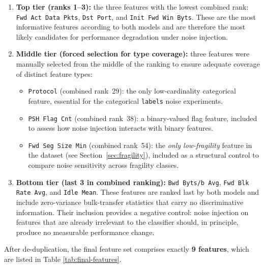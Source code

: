 \documentclass[../main.tex]{subfiles}
\begin{document}
\begin{itemize}
    \begin{enumerate}
        \item \textbf{Top tier (ranks 1–3):} the three features with the lowest combined rank: \texttt{Fwd Act Data Pkts}, \texttt{Dst Port}, and \texttt{Init Fwd Win Byts}.  These are the most informative features according to both models and are therefore the most likely candidates for performance degradation under noise injection.
        \item \textbf{Middle tier (forced selection for type coverage):} three features were manually selected from the middle of the ranking to ensure adequate coverage of distinct feature types:
        \begin{itemize}
            \item \texttt{Protocol} (combined rank~29): the only low-cardinality categorical feature, essential for the categorical \texttt{labels} noise experiments.
            \item \texttt{PSH Flag Cnt} (combined rank~38): a binary-valued flag feature, included to assess how noise injection interacts with binary features.
            \item \texttt{Fwd Seg Size Min} (combined rank~54): the \emph{only low-fragility} feature in the dataset (see Section~\ref{sec:fragility}), included as a structural control to compare noise sensitivity across fragility classes.
        \end{itemize}
        \item \textbf{Bottom tier (last 3 in combined ranking):} \texttt{Bwd Byts/b Avg}, \texttt{Fwd Blk Rate Avg}, and \texttt{Idle Mean}.  These features are ranked last by both models and include zero-variance bulk-transfer statistics that carry no discriminative information.  Their inclusion provides a negative control: noise injection on features that are already irrelevant to the classifier should, in principle, produce no measurable performance change.
    \end{enumerate}
    
    After de-duplication, the final feature set comprises exactly \textbf{9 features}, which are listed in Table \ref{tab:final-features}.
    

\end{itemize}
\end{document}
